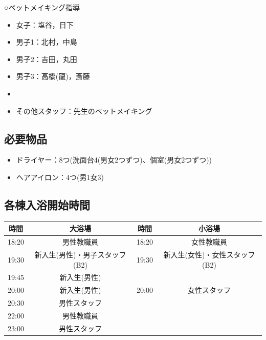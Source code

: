 ○ベットメイキング指導
\begin{itemize}
\item 女子：塩谷，日下
\item 男子1：北村，中島
\item 男子2：吉田，丸田
\item 男子3：高橋(龍)，斎藤
\item 
\item その他スタッフ：先生のベットメイキング
\end{itemize}
\subsection{必要物品}
\begin{itemize}
\item ドライヤー：8つ(洗面台4(男女2つずつ)、個室(男女2つずつ))
\item ヘアアイロン：4つ(男1女3)
\end{itemize}

\subsection{各棟入浴開始時間}
\label{sec:bath}
\begin{table}[H]
\begin{center}
\begin{tabular}{|c|c|c|c|}
\hline
 {時間}&{大浴場}&{時間}&{小浴場} \\ \hline
 18:20 & 男性教職員 & 18:20 & 女性教職員 \\ \hline
 19:30 & 新入生(男性)・男子スタッフ(B2) & 19:30 & 新入生(女性)・女性スタッフ(B2) \\ \hline
 19:45 & 新入生(男性) & & \\ \hline
 20:00 & 新入生(男性) & 20:00 & 女性スタッフ\\ \hline
 20:30 & 男性スタッフ & & \\ \hline
 22:00 & 男性教職員 & & \\ \hline
 23:00 & 男性スタッフ & & \\ \hline
\end{tabular}
\end{center}
\end{table}

